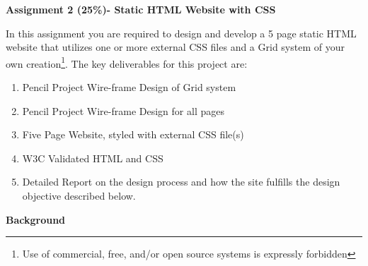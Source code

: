 
	
\begin{flushleft}
\Large\textbf{Assignment 2 (25\%)- Static HTML Website with CSS}\\
\end{flushleft}

In this assignment you are required to design and develop a 5 page static HTML website that utilizes one or more external CSS files and a Grid system of your own creation\footnote{Use of commercial, free, and/or open source systems is expressly forbidden}. The key deliverables for this project are:

\begin{enumerate}
	\item Pencil Project Wire-frame Design of Grid system
	\item Pencil Project Wire-frame Design for all pages
	\item Five Page Website, styled with external CSS file(s)
	\item W3C Validated HTML and CSS
	\item Detailed Report on the design process and how the site fulfills the design objective described below.
\end{enumerate}


\textbf{Background}\\



